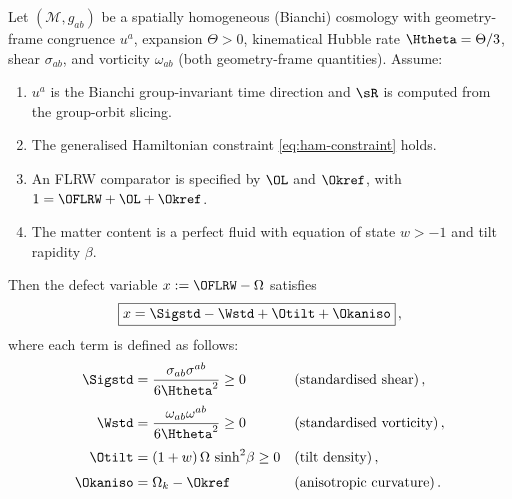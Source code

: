\begin{theorem}
\label{thm:master-defect-id}
Let $(\mathcal{M}, g_{ab})$ be a spatially homogeneous
(Bianchi) cosmology with geometry-frame congruence $u^a$,
expansion $\Theta > 0$, kinematical Hubble rate
$\Htheta = \Theta/3$, shear $\sigma_{ab}$, and vorticity
$\omega_{ab}$ (both geometry-frame quantities).  Assume:
\begin{enumerate}
\item[\emph{(i)}] $u^a$ is the Bianchi group-invariant time
  direction and $\sR$ is computed from the group-orbit slicing.
\item[\emph{(ii)}] The generalised Hamiltonian constraint
  \eqref{eq:ham-constraint} holds.
\item[\emph{(iii)}] An FLRW comparator is specified by
  $\OL$ and $\Okref$, with
  $1 = \OFLRW + \OL + \Okref$.
\item[\emph{(iv)}] The matter content is a perfect fluid with
  equation of state $w > -1$ and tilt rapidity $\beta$.
\end{enumerate}
Then the defect variable $x := \OFLRW - \Omega$ satisfies
\begin{equation}\label{eq:master-identity}
\boxed{x = \Sigstd - \Wstd + \Otilt + \Okaniso}\,,
\end{equation}
where each term is defined as follows:
\begin{align}
\Sigstd &= \frac{\sigma_{ab}\sigma^{ab}}{6\Htheta^2} \geq 0
  &&\text{(standardised shear)}\,,
  \label{eq:Sigstd-id}\\[3pt]
\Wstd &= \frac{\omega_{ab}\omega^{ab}}{6\Htheta^2} \geq 0
  &&\text{(standardised vorticity)}\,,
  \label{eq:Wstd-id}\\[3pt]
\Otilt &= (1+w)\,\Omega\,\sinh^2\!\beta \geq 0
  &&\text{(tilt density)}\,,
  \label{eq:Otilt-def}\\[3pt]
\Okaniso &= \Omega_k - \Okref
  &&\text{(anisotropic curvature)}\,.
  \label{eq:Oka-def}
\end{align}
\end{theorem}

